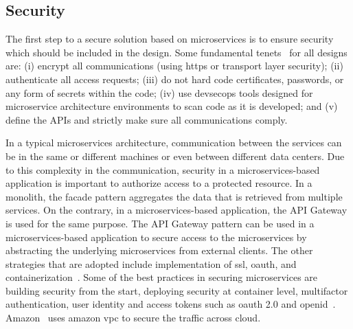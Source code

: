 

\subsection{Security}%
The first step to a secure solution based on microservices is to ensure security which should be included in the design. Some fundamental tenets~\cite{Olaf2016} for all designs are: 
(i) encrypt all communications (using https or transport layer security); 
(ii) authenticate all access requests;
(iii) do not hard code certificates, passwords, or any form of secrets within the code;
(iv) use devsecops tools designed for microservice architecture environments to scan code as it is developed;
and (v) define the APIs and strictly make sure all communications comply.

In a typical microservices architecture, communication between the services can be in the same or different machines or even between different data centers. Due to this complexity in the communication, security in a microservices-based application is important to authorize access to a protected resource.
In a monolith, the facade pattern aggregates the data that is retrieved from multiple services. On the contrary, in a microservices-based application, the API Gateway is used for the same purpose. The API Gateway pattern can be used in a microservices-based application to secure access to the microservices by abstracting the underlying microservices from external clients. The other strategies that are adopted include implementation of ssl, oauth, and containerization~\cite{Zaytev2018, tenev2019, Monterio2018}. 
%
Some of the best practices in securing microservices are building security from the start, deploying security at container level, multifactor authentication, user identity and access tokens such as oauth 2.0 and openid~\cite{Gonchar2017}. Amazon~\cite{Amazon} uses amazon vpc to secure the traffic across cloud.


